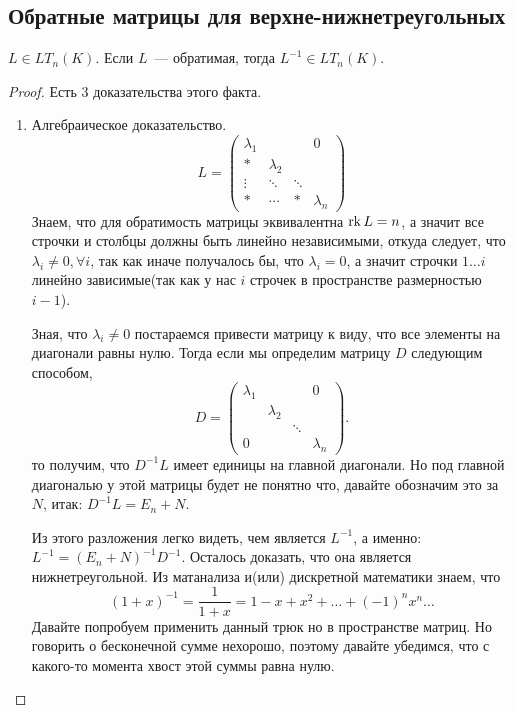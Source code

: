 \subsection{Обратные матрицы для верхне-нижнетреугольных}
\begin{statement}
     $L\in LT_n(K)$. Если $L$~--- обратимая, тогда $L^{-1}\in LT_n(K)$.
\end{statement}
\begin{proof}
    Есть 3 доказательства этого факта.
    \begin{enumerate}
        \item Алгебраическое доказательство.\\
            $$L = 
            \begin{pmatrix}
                \lambda_1&&&0\\
                *&\lambda_2&&\\
                \vdots&\ddots&\ddots&\\
                *&\cdots&*&\lambda_n
            \end{pmatrix}$$
            Знаем, что для обратимость матрицы эквивалентна $\operatorname{rk} L = n$, а значит все строчки и столбцы
            должны быть линейно независимыми, откуда следует, что $\lambda_i \not= 0, \forall i$, так как иначе
            получалось бы, что $\lambda_i = 0$, а значит строчки $1\dots i$ линейно зависимые(так как
            у нас $i$ строчек в пространстве размерностью $i - 1$).

            Зная, что $\lambda_i \not= 0$ постараемся привести матрицу к виду, что все элементы на диагонали 
            равны нулю.
            Тогда если мы определим матрицу $D$ следующим способом,
            \[
            D = \begin{pmatrix}
                \lambda_1&&&0\\
                &\lambda_2&&\\
                &&\ddots&\\
                0&&&\lambda_n
            \end{pmatrix}
            .\] 
            то получим, что $D^{-1} L$ имеет единицы на главной диагонали. Но под главной диагональю у этой матрицы будет
            не понятно что, давайте обозначим это за $N$, итак: $D^{-1}L = E_n + N$.

            Из этого разложения легко видеть, чем является $L^{-1}$, а именно: $L^{-1} = (E_n + N)^{-1}D^{-1}$.
            Осталось доказать, что она является нижнетреугольной.
            Из матанализа и(или) дискретной математики знаем, что 
            \[
                (1 + x)^{-1} = \frac{1}{1+x} = 1 - x + x^2 +\dots +(-1)^nx^n\dots
            \]
            Давайте попробуем применить данный трюк но в пространстве матриц.
            Но говорить о бесконечной сумме нехорошо, поэтому давайте убедимся,
            что с какого-то момента хвост этой суммы равна нулю.


\end{enumerate}
\end{proof}
